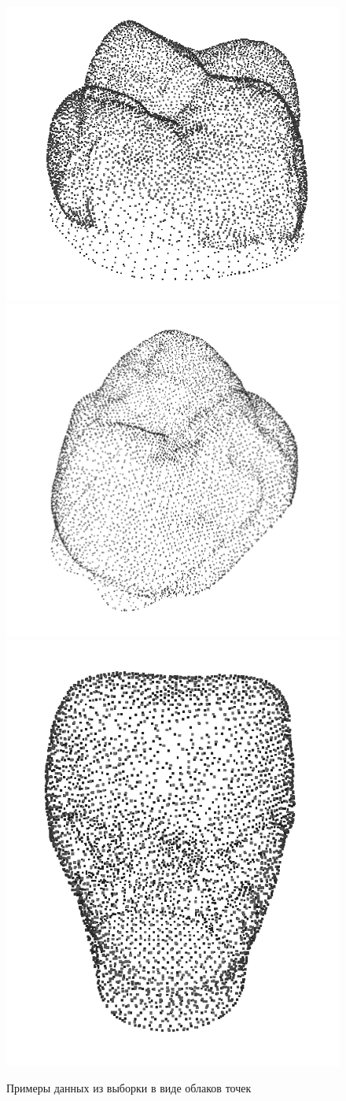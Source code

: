 \begin{figure}[ht!]
    \includegraphics[width=.3\textwidth]{images/snapshot1200.png}\hfill
    \includegraphics[width=.3\textwidth]{images/snapshot1201.png}\hfill
    \includegraphics[width=.3\textwidth]{images/snapshot1202.png}
    \label{fig:ex6}
    \caption{Примеры данных из выборки в виде облаков точек}
\end{figure}